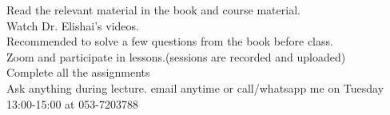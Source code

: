 \documentclass[preview]{standalone}
\begin{document}
Read the relevant material in the book and course material.\\Watch Dr. Elishai's videos.\\Recommended to solve a few questions from the book before class.\\Zoom and participate in lessons.(sessions are recorded and uploaded)\\Complete all the assignments\\Ask anything during lecture. email anytime or call/whatsapp me on Tuesday 13:00-15:00 at 053-7203788\\
\end{document}

